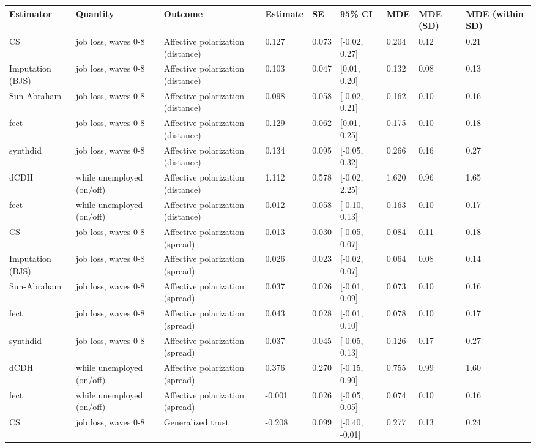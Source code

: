 
\begin{tabular}{lllllllll}
\toprule
Estimator & Quantity & Outcome & Estimate & SE & 95\% CI & MDE & MDE (SD) & MDE (within SD)\\
\midrule
CS & job loss, waves 0-8 & Affective polarization (distance) & 0.127 & 0.073 & {}[-0.02, 0.27] & 0.204 & 0.12 & 0.21\\
Imputation (BJS) & job loss, waves 0-8 & Affective polarization (distance) & 0.103 & 0.047 & {}[0.01, 0.20] & 0.132 & 0.08 & 0.13\\
Sun-Abraham & job loss, waves 0-8 & Affective polarization (distance) & 0.098 & 0.058 & {}[-0.02, 0.21] & 0.162 & 0.10 & 0.16\\
fect & job loss, waves 0-8 & Affective polarization (distance) & 0.129 & 0.062 & {}[0.01, 0.25] & 0.175 & 0.10 & 0.18\\
synthdid & job loss, waves 0-8 & Affective polarization (distance) & 0.134 & 0.095 & {}[-0.05, 0.32] & 0.266 & 0.16 & 0.27\\
dCDH & while unemployed (on/off) & Affective polarization (distance) & 1.112 & 0.578 & {}[-0.02, 2.25] & 1.620 & 0.96 & 1.65\\
fect & while unemployed (on/off) & Affective polarization (distance) & 0.012 & 0.058 & {}[-0.10, 0.13] & 0.163 & 0.10 & 0.17\\
CS & job loss, waves 0-8 & Affective polarization (spread) & 0.013 & 0.030 & {}[-0.05, 0.07] & 0.084 & 0.11 & 0.18\\
Imputation (BJS) & job loss, waves 0-8 & Affective polarization (spread) & 0.026 & 0.023 & {}[-0.02, 0.07] & 0.064 & 0.08 & 0.14\\
Sun-Abraham & job loss, waves 0-8 & Affective polarization (spread) & 0.037 & 0.026 & {}[-0.01, 0.09] & 0.073 & 0.10 & 0.16\\
fect & job loss, waves 0-8 & Affective polarization (spread) & 0.043 & 0.028 & {}[-0.01, 0.10] & 0.078 & 0.10 & 0.17\\
synthdid & job loss, waves 0-8 & Affective polarization (spread) & 0.037 & 0.045 & {}[-0.05, 0.13] & 0.126 & 0.17 & 0.27\\
dCDH & while unemployed (on/off) & Affective polarization (spread) & 0.376 & 0.270 & {}[-0.15, 0.90] & 0.755 & 0.99 & 1.60\\
fect & while unemployed (on/off) & Affective polarization (spread) & -0.001 & 0.026 & {}[-0.05, 0.05] & 0.074 & 0.10 & 0.16\\
CS & job loss, waves 0-8 & Generalized trust & -0.208 & 0.099 & {}[-0.40, -0.01] & 0.277 & 0.13 & 0.24\\

\end{tabular}
